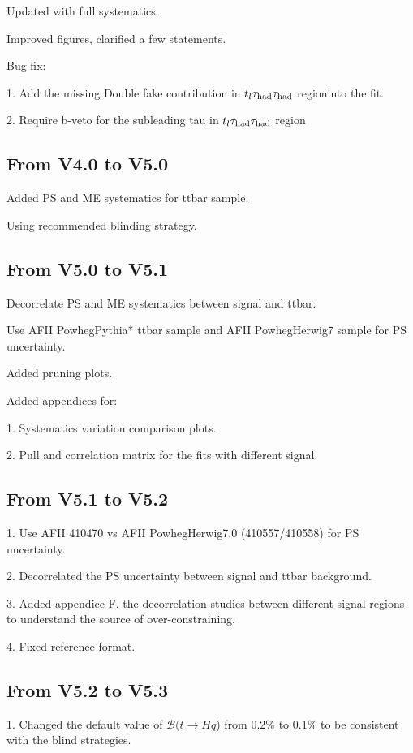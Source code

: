 Updated with full systematics.

Improved figures, clarified a few statements.

Bug fix:

1. Add the missing Double fake contribution in $t_l\tau_\text{had}\tau_\text{had}$ regioninto the fit.

2. Require b-veto for the subleading tau in $t_l\tau_\text{had}\tau_\text{had}$ region

\subsection{From V4.0 to V5.0}

Added PS and ME systematics for ttbar sample.

Using recommended blinding strategy.

\subsection{From V5.0 to V5.1}

Decorrelate PS and ME systematics between signal and ttbar.

Use AFII PowhegPythia* ttbar sample and AFII PowhegHerwig7 sample for PS uncertainty.

Added pruning plots.

Added appendices for:

1. Systematics variation comparison plots.

2. Pull and correlation matrix for the fits with different signal.

\subsection{From V5.1 to V5.2}

1. Use AFII 410470 vs AFII PowhegHerwig7.0 (410557/410558) for PS uncertainty.

2. Decorrelated the PS uncertainty between signal and ttbar background.

3. Added appendice F. the decorrelation studies between different signal regions to understand the source of over-constraining.

4. Fixed reference format.

\subsection{From V5.2 to V5.3}

1. Changed the default value of $\mathcal{B}(t\rightarrow Hq$) from 0.2\% to 0.1\% to be consistent with the blind strategies.

